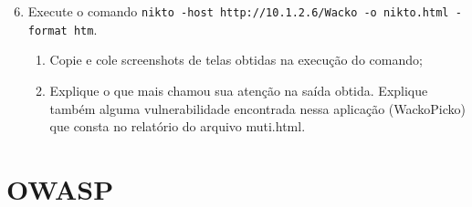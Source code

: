 \documentclass{article}
\begin{document}
    \begin{superframe}
        \begin{enumerate}
            \setcounter{enumi}{5}
            \item Execute o comando \texttt{nikto -host http://10.1.2.6/Wacko -o nikto.html -format htm}.
                \begin{enumerate}
                    \item Copie e cole screenshots de telas obtidas na execução do
                        comando;
                    \item Explique o que mais chamou sua atenção na saída obtida.
                        Explique também alguma vulnerabilidade encontrada nessa
                        aplicação (WackoPicko) que consta no relatório do arquivo
                        muti.html.
                \end{enumerate}
        \end{enumerate}
    \end{superframe}

    \section{OWASP}
\end{document}

